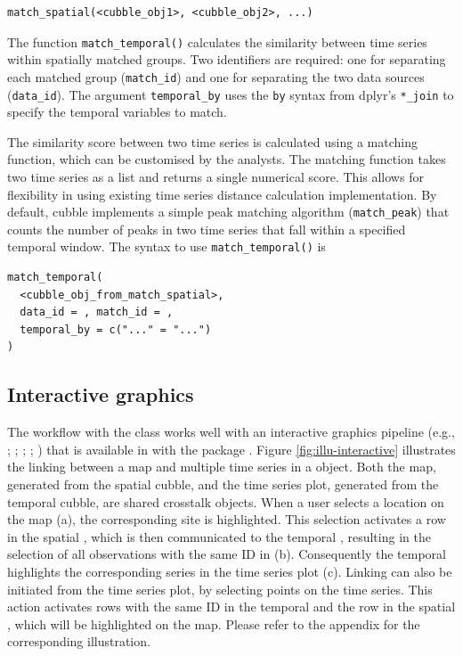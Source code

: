 \documentclass[
]{jss}
\begin{document}
\begin{verbatim}
match_spatial(<cubble_obj1>, <cubble_obj2>, ...)
\end{verbatim}

The function \texttt{match\_temporal()} calculates the similarity
between time series within spatially matched groups. Two identifiers are
required: one for separating each matched group (\texttt{match\_id}) and
one for separating the two data sources (\texttt{data\_id}). The
argument \texttt{temporal\_by} uses the \texttt{by} syntax from dplyr's
\texttt{*\_join} to specify the temporal variables to match.

The similarity score between two time series is calculated using a
matching function, which can be customised by the analysts. The matching
function takes two time series as a list and returns a single numerical
score. This allows for flexibility in using existing time series
distance calculation implementation. By default, cubble implements a
simple peak matching algorithm (\texttt{match\_peak}) that counts the
number of peaks in two time series that fall within a specified temporal
window. The syntax to use \texttt{match\_temporal()} is

\begin{verbatim}
match_temporal(
  <cubble_obj_from_match_spatial>, 
  data_id = , match_id = , 
  temporal_by = c("..." = "...")
)
\end{verbatim}

\hypertarget{interactive-graphics}{%
\subsection{Interactive graphics}\label{interactive-graphics}}

The workflow with the  class works well with an interactive
graphics pipeline (e.g., \citet{buja1988elements};
\citet{buja1996interactive}; \citet{sutherland2000orca};
\citet{xie2014reactive}; \citet{cheng2016enabling}) that is available in
 with the package  \citep{crosstalk}. Figure
\ref{fig:illu-interactive} illustrates the linking between a map and
multiple time series in a  object. Both the map, generated
from the spatial cubble, and the time series plot, generated from the
temporal cubble, are shared crosstalk objects. When a user selects a
location on the map (a), the corresponding site is highlighted. This
selection activates a row in the spatial , which is then
communicated to the temporal , resulting in the selection
of all observations with the same ID in (b). Consequently the temporal
 highlights the corresponding series in the time series
plot (c). Linking can also be initiated from the time series plot, by
selecting points on the time series. This action activates rows with the
same ID in the temporal  and the row in the spatial
, which will be highlighted on the map. Please refer to the
appendix for the corresponding illustration.
\end{document}
